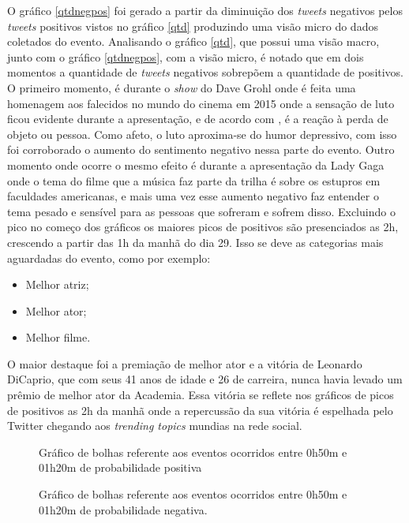 O gráfico \ref{qtdnegpos} foi gerado a partir da diminuição dos \textit{tweets} negativos pelos \textit{tweets} positivos vistos no gráfico \ref{qtd} produzindo uma visão micro do dados coletados do evento. Analisando o gráfico \ref{qtd}, que possui uma visão macro, junto com o gráfico \ref{qtdnegpos}, com a visão micro, é notado que em dois momentos a quantidade de \textit{tweets} negativos sobrepõem a quantidade de positivos. O primeiro momento, é durante o \textit{show} do Dave Grohl onde é feita uma homenagem aos falecidos no mundo do cinema em 2015 onde a sensação de luto ficou evidente durante a apresentação, e de acordo com \cite{freud1908conferencias}, é a reação à perda de objeto ou pessoa. Como afeto, o luto aproxima-se do humor depressivo, com isso foi corroborado o aumento do sentimento negativo nessa parte do evento. Outro momento onde ocorre o mesmo efeito é durante a apresentação da Lady Gaga onde o tema do filme que a  música faz parte da trilha é sobre os estupros em faculdades americanas, e mais uma vez esse aumento negativo faz entender o tema pesado e sensível para as pessoas que sofreram e sofrem disso. Excluindo o pico no começo dos gráficos os maiores picos de positivos são presenciados as 2h, crescendo a partir das 1h da manhã do dia 29. Isso se deve as categorias mais aguardadas do evento, como por exemplo:

 \begin{itemize}
 	\item Melhor atriz;
 	\item Melhor ator;
 	\item Melhor filme.
 \end{itemize}

O maior destaque foi a premiação de melhor ator e a vitória de Leonardo DiCaprio, que com seus 41 anos de idade e 26 de carreira, nunca havia levado um prêmio de melhor ator da Academia. Essa vitória se reflete nos gráficos de picos de positivos as 2h da manhã onde a repercussão da sua vitória é espelhada pelo Twitter chegando aos \textit{trending topics} mundias na rede social.

\begin{figure}[H]
	\centering{}
	\caption{Gráfico de bolhas referente aos eventos ocorridos entre 0h50m e 01h20m de probabilidade positiva}
	\label{pos1}
\end{figure}

\begin{figure}[H]
	\centering{}
	\caption{Gráfico de bolhas referente aos eventos ocorridos entre 0h50m e 01h20m de probabilidade negativa.}
	\label{neg1}
\end{figure}

